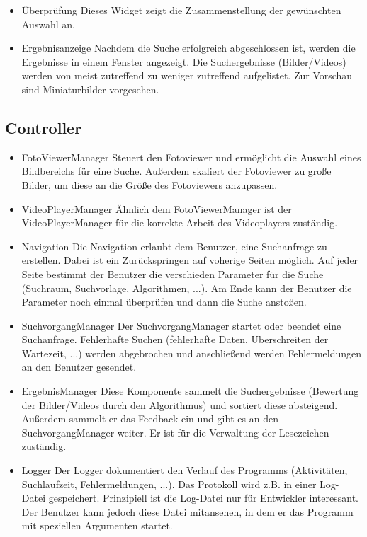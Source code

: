 \begin{itemize}
\item Überprüfung \newline 
Dieses Widget zeigt die Zusammenstellung der gewünschten Auswahl an.

\item Ergebnisanzeige \newline
Nachdem die Suche erfolgreich abgeschlossen ist, werden die Ergebnisse in einem Fenster angezeigt. Die Suchergebnisse (Bilder/Videos) werden von meist zutreffend zu weniger zutreffend aufgelistet. Zur Vorschau sind Miniaturbilder vorgesehen.

\end{itemize}
\subsection{Controller}
\begin{itemize}
\item FotoViewerManager \newline
Steuert den Fotoviewer und ermöglicht die Auswahl eines Bildbereichs für eine Suche. Außerdem skaliert der Fotoviewer zu große Bilder, um diese an die Größe des Fotoviewers anzupassen.

\item VideoPlayerManager \newline
Ähnlich dem FotoViewerManager ist der VideoPlayerManager für die korrekte Arbeit des Videoplayers zuständig.

\item Navigation \newline
Die Navigation erlaubt dem Benutzer, eine Suchanfrage zu erstellen. Dabei ist ein Zurückspringen auf voherige Seiten möglich. Auf jeder Seite bestimmt der Benutzer die verschieden Parameter für die Suche (Suchraum, Suchvorlage, Algorithmen, ...). Am Ende kann der Benutzer die Parameter noch einmal überprüfen und dann die Suche anstoßen.

\item SuchvorgangManager \newline
Der SuchvorgangManager startet oder beendet eine Suchanfrage. Fehlerhafte Suchen (fehlerhafte Daten, Überschreiten der Wartezeit, ...) werden abgebrochen und anschließend werden Fehlermeldungen an den Benutzer gesendet.

\item ErgebnisManager \newline
Diese Komponente sammelt die Suchergebnisse (Bewertung der Bilder/Videos durch den Algorithmus) und sortiert diese absteigend. Außerdem sammelt er das Feedback ein und gibt es an den SuchvorgangManager weiter. Er ist für die Verwaltung der Lesezeichen zuständig.

\item Logger \newline
Der Logger dokumentiert den Verlauf des Programms (Aktivitäten, Suchlaufzeit, Fehlermeldungen, ...). Das Protokoll wird z.B. in einer Log-Datei gespeichert. Prinzipiell ist die Log-Datei nur für Entwickler interessant. Der Benutzer kann jedoch diese Datei mitansehen, in dem er das Programm mit speziellen Argumenten startet.
\end{itemize}
\pagebreak
